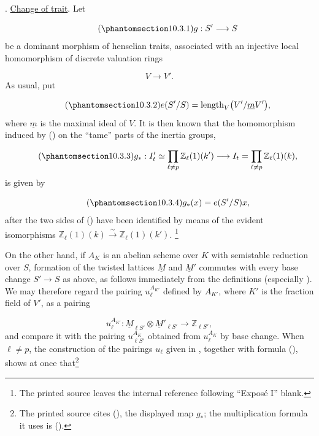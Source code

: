 
\medskip
\noindent
{}. \underline{Change of trait}. Let

\begin{equation}\tag{\SGARefTarget{sga7.sga7i.eix.n10-3-1}{10.3.1}}
g:S'\longrightarrow S
\end{equation}
be a dominant morphism of henselian traits, associated with an injective
local homomorphism of discrete valuation rings

\begin{equation*}
V\longrightarrow V'.
\end{equation*}
As usual, put

\begin{equation}\tag{\SGARefTarget{sga7.sga7i.eix.n10-3-2}{10.3.2}}
e(S'/S)=\operatorname{length}_V\bigl(V'/\underline mV'\bigr),
\end{equation}
where $\underline m$ is the maximal ideal of $V$. It is then known that
the homomorphism induced by () on the ``tame'' parts of the inertia
groups,

\begin{equation}\tag{\SGARefTarget{sga7.sga7i.eix.n10-3-3}{10.3.3}}
g_*:I'_t\simeq\prod_{\ell\ne p}\mathbb Z_\ell(1)(k')
 \longrightarrow
 I_t=\prod_{\ell\ne p}\mathbb Z_\ell(1)(k),
\end{equation}
is given by

\begin{equation}\tag{\SGARefTarget{sga7.sga7i.eix.n10-3-4}{10.3.4}}
g_*(x)=e(S'/S)x,
\end{equation}
after the two sides of () have been identified by means of the
evident isomorphisms
$\mathbb Z_\ell(1)(k)\xrightarrow{\ \sim\ }\mathbb Z_\ell(1)(k')$.
\footnote{The printed source leaves the internal reference following
``Expos\'e I'' blank.}

On the other hand, if $A_K$ is an abelian scheme over $K$ with
semistable reduction over $S$, formation of the twisted lattices
$\underline M$ and $\underline M'$ commutes with every base change
$S'\longrightarrow S$ as above, as follows immediately from the
definitions (especially ). We may therefore regard the pairing
$u_\ell^{A_{K'}}$ defined by $A_{K'}$, where $K'$ is the fraction field
of $V'$, as a pairing

\begin{equation*}
u_\ell^{A_{K'}}:
 \underline M_{\ell S'}\otimes\underline M'_{\ell S'}
 \longrightarrow\mathbb Z_{\ell S'},
\end{equation*}
and compare it with the pairing $u_{\ell S'}^{A_K}$ obtained from
$u_\ell^{A_K}$ by base change. When $\ell\ne p$, the construction of the
pairings $u_\ell$ given in , together with formula (), shows at
once that\footnote{The printed source cites (), the displayed map
$g_*$; the multiplication formula it uses is ().}


